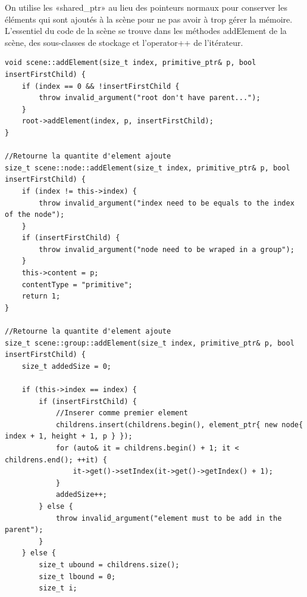 On utilise les «shared\_ptr» au lieu des pointeurs normaux pour conserver les éléments qui sont ajoutés à la scène pour ne pas avoir à trop gérer la mémoire.\\

L'essentiel du code de la scène se trouve dans les méthodes addElement de la scène, des sous-classes de stockage et l'operator++ de l'itérateur.\\

\begin{lstlisting}
void scene::addElement(size_t index, primitive_ptr& p, bool insertFirstChild) {
	if (index == 0 && !insertFirstChild {
		throw invalid_argument("root don't have parent...");
	}
	root->addElement(index, p, insertFirstChild);
}

//Retourne la quantite d'element ajoute
size_t scene::node::addElement(size_t index, primitive_ptr& p, bool insertFirstChild) {
	if (index != this->index) {
		throw invalid_argument("index need to be equals to the index of the node");
	}
	if (insertFirstChild) {
		throw invalid_argument("node need to be wraped in a group");
	}
	this->content = p;
	contentType = "primitive";
	return 1;
}

//Retourne la quantite d'element ajoute
size_t scene::group::addElement(size_t index, primitive_ptr& p, bool insertFirstChild) {
	size_t addedSize = 0;
	
	if (this->index == index) {
		if (insertFirstChild) {
			//Inserer comme premier element
			childrens.insert(childrens.begin(), element_ptr{ new node{ index + 1, height + 1, p } });
			for (auto& it = childrens.begin() + 1; it < childrens.end(); ++it) {
				it->get()->setIndex(it->get()->getIndex() + 1);
			}
			addedSize++;
		} else {
			throw invalid_argument("element must to be add in the parent");
		}
	} else {
		size_t ubound = childrens.size();
		size_t lbound = 0;
		size_t i;
		

\end{lstlisting}
